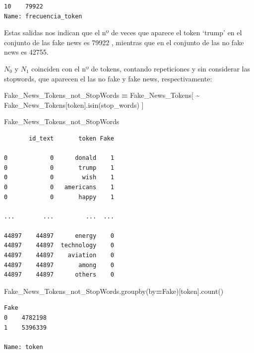 \documentclass[
  11pt,
  a4paper,
]{article}
\newenvironment{Shaded}{\begin{snugshade}}{\end{snugshade}}
\newcommand{\NormalTok}[1]{#1}
\newcommand{\OperatorTok}[1]{\textcolor[rgb]{0.81,0.36,0.00}{\textbf{#1}}}
\newcommand{\StringTok}[1]{\textcolor[rgb]{0.31,0.60,0.02}{#1}}
\begin{document}
\begin{verbatim}
10    79922
Name: frecuencia_token 
\end{verbatim}

Estas salidas nos indican que el nº de veces que aparece el token
`trump' en el conjunto de las fake news es 79922 , mientras que en el
conjunto de las no fake news es 42755.

\(N_0\) y \(N_1\) coinciden con el nº de tokens, contando repeticiones y
sin considerar las stopwords, que aparecen el las no fake y fake news,
respectivamente:

\begin{Shaded}
\begin{Highlighting}[]
\NormalTok{Fake\_News\_Tokens\_not\_StopWords }\OperatorTok{=}\NormalTok{ Fake\_News\_Tokens[ }\OperatorTok{\textasciitilde{}}\NormalTok{ Fake\_News\_Tokens[}\StringTok{\textquotesingle{}token\textquotesingle{}}\NormalTok{].isin(stop\_words) ]}

\NormalTok{Fake\_News\_Tokens\_not\_StopWords}
\end{Highlighting}
\end{Shaded}

\begin{verbatim}
       id_text       token Fake
       
0            0      donald    1
0            0       trump    1
0            0        wish    1
0            0   americans    1
0            0       happy    1

...        ...         ...  ...

44897    44897      energy    0
44897    44897  technology    0
44897    44897    aviation    0
44897    44897       among    0
44897    44897      others    0
\end{verbatim}

\begin{Shaded}
\begin{Highlighting}[]
\NormalTok{Fake\_News\_Tokens\_not\_StopWords.groupby(by}\OperatorTok{=}\StringTok{\textquotesingle{}Fake\textquotesingle{}}\NormalTok{)[}\StringTok{\textquotesingle{}token\textquotesingle{}}\NormalTok{].count()}
\end{Highlighting}
\end{Shaded}

\begin{verbatim}
Fake
0    4782198
1    5396339

Name: token
\end{verbatim}
\end{document}
